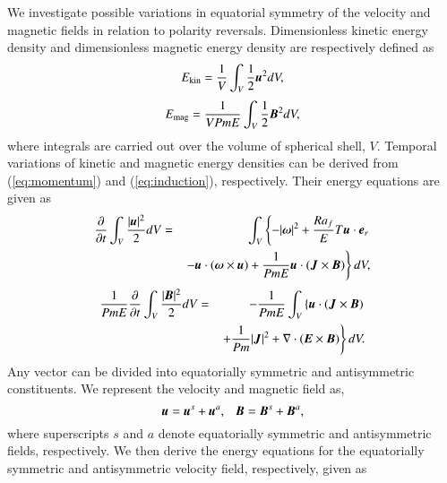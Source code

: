 We investigate possible variations in equatorial symmetry of the velocity and magnetic fields in relation to polarity reversals. %
Dimensionless kinetic energy density and dimensionless magnetic energy density are respectively defined as
%
\begin{equation}
E_{\rm kin} = \frac{1}{V}
  \int_V \frac{1}{2} \mbox{\boldmath$u$}^2 d V ,
\label{eq:Ekin}
\end{equation}
%
\begin{equation}
E_{\rm mag} = \frac{1}{V Pm E}
  \int_V \frac{1}{2} \mbox{\boldmath$B$}^2 d V ,
\label{eq:Emag}
\end{equation}
%
where integrals are carried out over the volume of spherical shell, $V$.
Temporal variations of kinetic and magnetic energy densities can be derived from (\ref{eq:momentum}) and (\ref{eq:induction}), respectively.
Their energy equations are given as
%
\begin{eqnarray}
\frac{\partial}{\partial t}
 \int_V \frac{|\mbox{\boldmath$u$}|^2}{2} d V
 &=& \int_V \left\{
    - |\mbox{\boldmath$\omega$}|^2 
    + \frac{Ra_f}{E}T \mbox{\boldmath$u$}\cdot \mbox{\boldmath$e$}_r
      \right.
\nonumber \\
 & & \left.
    - \mbox{\boldmath$u$} \cdot (\mbox{\boldmath$\omega$}\times\mbox{\boldmath$u$})
    + \frac{1}{Pm E} \mbox{\boldmath$u$} \cdot
                     (\mbox{\boldmath$J$} \times \mbox{\boldmath$B$})
      \right\} d V,
\label{eq:energy_u}
\end{eqnarray}
%
\begin{eqnarray}
\frac{1}{Pm E}\frac{\partial}{\partial t}
 \int_V \frac{|\mbox{\boldmath$B$}|^2}{2} d V
  & = & 
- \frac{1}{Pm E}\int_V \left\{
      \mbox{\boldmath$u$} \cdot ( \mbox{\boldmath$J$} \times \mbox{\boldmath$B$} )
\right. \nonumber \\
 & &    \left.
    + \frac{1}{Pm} |\mbox{\boldmath$J$}|^2
    + \nabla \cdot ( \mbox{\boldmath$E$} \times \mbox{\boldmath$B$} ) 
      \right\} d V.
\label{eq:energy_B}
\end{eqnarray}
%
Any vector can be divided into equatorially symmetric and antisymmetric constituents.
We represent the velocity and magnetic field as,
%
\begin{equation}
\mbox{\boldmath$u$} = \mbox{\boldmath$u$}^s + \mbox{\boldmath$u$}^a, ~~~
\mbox{\boldmath$B$} = \mbox{\boldmath$B$}^s + \mbox{\boldmath$B$}^a,
\label{eq:eqas}
\end{equation}
%
where superscripts $s$ and $a$ denote equatorially symmetric and antisymmetric fields, respectively.
We then derive the energy equations for the equatorially symmetric and antisymmetric velocity field, respectively, given as
